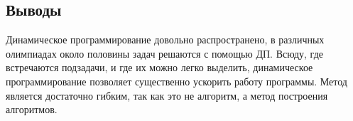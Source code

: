\documentclass[12pt]{article}
\begin{document}
\subsection*{Выводы}

Динамическое программирование довольно распространено, в различных олимпиадах около половины задач решаются с помощью ДП. Всюду, где встречаются подзадачи, и где их можно легко выделить, динамическое программирование позволяет существенно ускорить работу программы. Метод является достаточно гибким, так как это не алгоритм, а метод построения алгоритмов.
\end{document}
